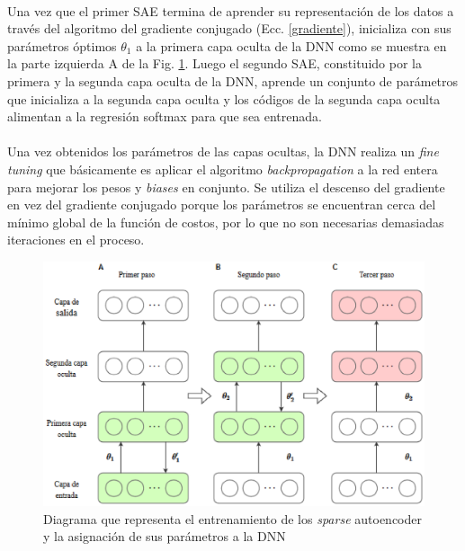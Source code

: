 \documentclass[12pt]{article}%
\begin{document}
\paragraph{}
Una vez que el primer SAE termina de aprender su representación de los datos a través del algoritmo del gradiente conjugado (Ecc. \ref{gradiente}), inicializa con sus parámetros óptimos $\theta_{1}$ a la primera capa oculta de la DNN como se muestra en la parte izquierda A de la Fig. \ref{fig:deepnet}. Luego el segundo SAE, constituido por la primera y la segunda capa oculta de la DNN, aprende un conjunto de parámetros que inicializa a la segunda capa oculta y los códigos de la segunda capa oculta alimentan a la regresión softmax para que sea entrenada.

\paragraph{}
Una vez obtenidos los parámetros de las capas ocultas, la DNN realiza un \textit{fine tuning} que básicamente es aplicar el algoritmo \textit{backpropagation} a la red entera para mejorar los pesos y \textit{biases} en conjunto. Se utiliza el descenso del gradiente en vez del gradiente conjugado porque los parámetros se encuentran cerca del mínimo global de la función de costos, por lo que no son necesarias demasiadas iteraciones en el proceso.


\begin{figure}[ht]
  \centering
    \includegraphics[scale=0.9]{./training.eps}
  \caption{Diagrama que representa el entrenamiento de los \textit{sparse} autoencoder y la asignación de sus parámetros a la DNN}
  \label{fig:deepnet}
\end{figure}
\end{document}
